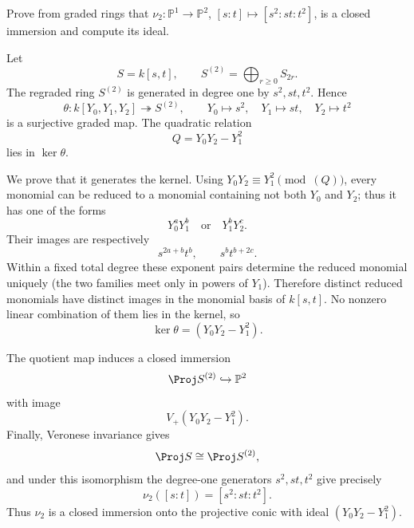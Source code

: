 \begin{problem}\label{prob:vi38-06}
Prove from graded rings that \(\nu_2:\mathbb P^1\to\mathbb P^2\), \([s:t]\mapsto[s^2:st:t^2]\), is a closed immersion and compute its ideal.
\end{problem}

\ifdefined\FullProblemDossiers
\begin{solution}
Let
\[
S=k[s,t],
\qquad
S^{(2)}=\bigoplus_{r\ge0}S_{2r}.
\]
The regraded ring \(S^{(2)}\) is generated in degree one by
\(s^2,st,t^2\). Hence
\[
\theta:k[Y_0,Y_1,Y_2]\twoheadrightarrow S^{(2)},
\qquad
Y_0\mapsto s^2,
\quad Y_1\mapsto st,
\quad Y_2\mapsto t^2
\]
is a surjective graded map.  The quadratic relation
\[
Q=Y_0Y_2-Y_1^2
\]
lies in \(\ker\theta\).

We prove that it generates the kernel.  Using
\(Y_0Y_2\equiv Y_1^2\pmod{(Q)}\), every monomial can be reduced to a monomial
containing not both \(Y_0\) and \(Y_2\); thus it has one of the forms
\[
Y_0^aY_1^b
\quad\text{or}\quad
Y_1^bY_2^c.
\]
Their images are respectively
\[
s^{2a+b}t^b,
\qquad
s^bt^{b+2c}.
\]
Within a fixed total degree these exponent pairs determine the reduced monomial
uniquely (the two families meet only in powers of \(Y_1\)). Therefore distinct
reduced monomials have distinct images in the monomial basis of \(k[s,t]\). No
nonzero linear combination of them lies in the kernel, so
\[
\boxed{\ker\theta=(Y_0Y_2-Y_1^2)}.
\]

The quotient map induces a closed immersion
\[
\Proj S^{(2)}\hookrightarrow\mathbb P^2
\]
with image
\[
V_+(Y_0Y_2-Y_1^2).
\]
Finally, Veronese invariance gives
\[
\Proj S\cong\Proj S^{(2)},
\]
and under this isomorphism the degree-one generators \(s^2,st,t^2\) give precisely
\[
\boxed{\nu_2([s:t])=[s^2:st:t^2]}.
\]
Thus \(\nu_2\) is a closed immersion onto the projective conic with ideal
\((Y_0Y_2-Y_1^2)\).
\end{solution}
\fi
